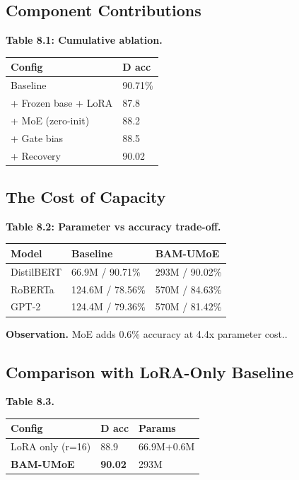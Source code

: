 \subsection{Component Contributions}

\textbf{Table 8.1: Cumulative ablation.}

\begin{table}[H]
\centering
\small
\begin{tabular}{ll}
\toprule
\textbf{Config} & \textbf{D acc} \\
\midrule
Baseline & 90.71\% \\
+ Frozen base + LoRA & 87.8 \\
+ MoE (zero-init) & 88.2 \\
+ Gate bias & 88.5 \\
+ Recovery & 90.02 \\
\bottomrule
\end{tabular}
\end{table}

\subsection{The Cost of Capacity}

\textbf{Table 8.2: Parameter vs accuracy trade-off.}

\begin{table}[H]
\centering
\small
\begin{tabular}{lll}
\toprule
\textbf{Model} & \textbf{Baseline} & \textbf{BAM-UMoE} \\
\midrule
DistilBERT & 66.9M / 90.71\% & 293M / 90.02\% \\
RoBERTa & 124.6M / 78.56\% & 570M / 84.63\% \\
GPT-2 & 124.4M / 79.36\% & 570M / 81.42\% \\
\bottomrule
\end{tabular}
\end{table}

\textbf{Observation.} MoE adds 0.6\% accuracy at 4.4x parameter cost..

\subsection{Comparison with LoRA-Only Baseline}

\textbf{Table 8.3.}

\begin{table}[H]
\centering
\small
\begin{tabular}{lll}
\toprule
\textbf{Config} & \textbf{D acc} & \textbf{Params} \\
\midrule
LoRA only (r=16) & 88.9 & 66.9M+0.6M \\
\textbf{BAM-UMoE} & \textbf{90.02} & 293M \\
\bottomrule
\end{tabular}
\end{table}


